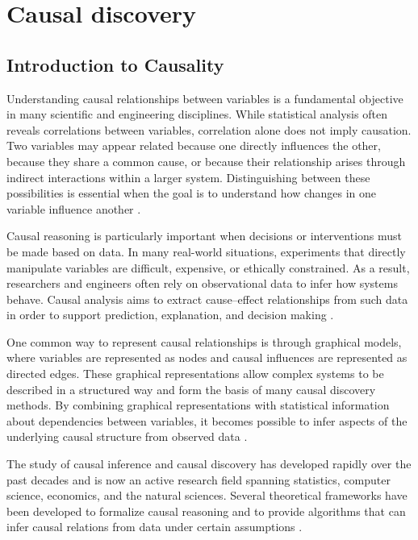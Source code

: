 \chapter{Causal discovery}
\label{cha:1}

\section{Introduction to Causality}

Understanding causal relationships between variables is a fundamental objective in many scientific and engineering disciplines. While statistical analysis often reveals correlations between variables, correlation alone does not imply causation. Two variables may appear related because one directly influences the other, because they share a common cause, or because their relationship arises through indirect interactions within a larger system. Distinguishing between these possibilities is essential when the goal is to understand how changes in one variable influence another \cite{Pearl2009,Spirtes2000}.

Causal reasoning is particularly important when decisions or interventions must be made based on data. In many real-world situations, experiments that directly manipulate variables are difficult, expensive, or ethically constrained. As a result, researchers and engineers often rely on observational data to infer how systems behave. Causal analysis aims to extract cause--effect relationships from such data in order to support prediction, explanation, and decision making \cite{Pearl2009}.

One common way to represent causal relationships is through graphical models, where variables are represented as nodes and causal influences are represented as directed edges. These graphical representations allow complex systems to be described in a structured way and form the basis of many causal discovery methods. By combining graphical representations with statistical information about dependencies between variables, it becomes possible to infer aspects of the underlying causal structure from observed data \cite{Spirtes2000}.

The study of causal inference and causal discovery has developed rapidly over the past decades and is now an active research field spanning statistics, computer science, economics, and the natural sciences. Several theoretical frameworks have been developed to formalize causal reasoning and to provide algorithms that can infer causal relations from data under certain assumptions \cite{Pearl2009,Spirtes2000,Peters2017}.
